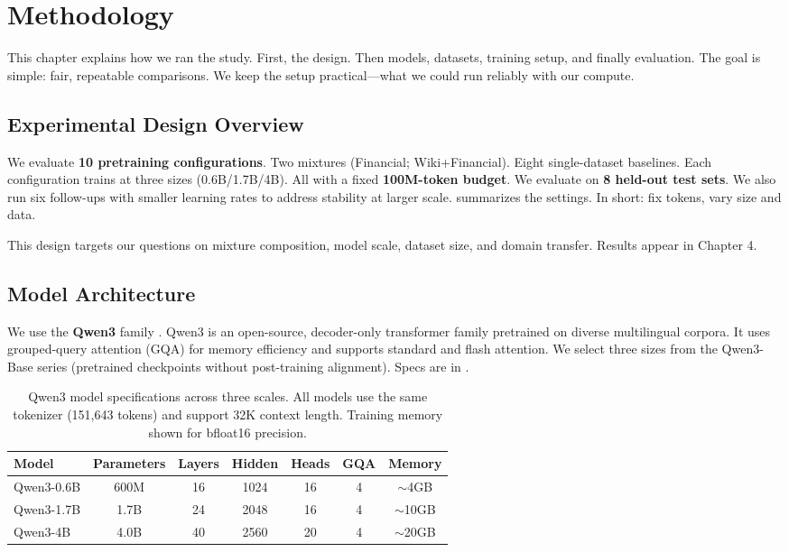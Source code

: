 \chapter{Methodology}

This chapter explains how we ran the study. First, the design. Then models, datasets, training setup, and finally evaluation. The goal is simple: fair, repeatable comparisons. We keep the setup practical—what we could run reliably with our compute.

\section{Experimental Design Overview}

We evaluate \textbf{10 pretraining configurations}. Two mixtures (Financial; Wiki+Financial). Eight single-dataset baselines. Each configuration trains at three sizes (0.6B/1.7B/4B). All with a fixed \textbf{100M-token budget}. We evaluate on \textbf{8 held-out test sets}. We also run six follow-ups with smaller learning rates to address stability at larger scale.  summarizes the settings. In short: fix tokens, vary size and data.



This design targets our questions on mixture composition, model scale, dataset size, and domain transfer. Results appear in Chapter 4.

\section{Model Architecture}

We use the \textbf{Qwen3} family \parencite{yang2024qwen2}. Qwen3 is an open-source, decoder-only transformer family pretrained on diverse multilingual corpora. It uses grouped-query attention (GQA) for memory efficiency and supports standard and flash attention. We select three sizes from the Qwen3-Base series (pretrained checkpoints without post-training alignment). Specs are in .

\begin{table}[h]
\centering
\caption[Qwen3 Model Specifications]{Qwen3 model specifications across three scales. All models use the same tokenizer (151,643 tokens) and support 32K context length. Training memory shown for bfloat16 precision.}
\label{tab:model_specs}
\begin{tabular}{lcccccc}
\toprule
\textbf{Model} & \textbf{Parameters} & \textbf{Layers} & \textbf{Hidden} & \textbf{Heads} & \textbf{GQA} & \textbf{Memory} \\
\midrule
Qwen3-0.6B & 600M & 16 & 1024 & 16 & 4 & $\sim$4GB \\
Qwen3-1.7B & 1.7B & 24 & 2048 & 16 & 4 & $\sim$10GB \\
Qwen3-4B & 4.0B & 40 & 2560 & 20 & 4 & $\sim$20GB \\
\bottomrule
\end{tabular}
\end{table}

